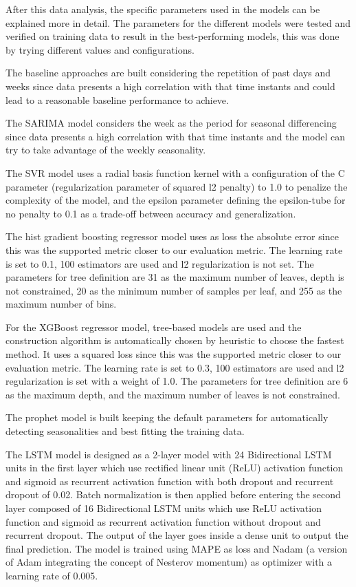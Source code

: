 After this data analysis, the specific parameters used in the models can be explained more in detail.
The parameters for the different models were tested and verified on training data to result in the best-performing models, this was done by trying different values and configurations.

The baseline approaches are built considering the repetition of past days and weeks since data presents a high correlation with that time instants and could lead to a reasonable baseline performance to achieve.

The SARIMA model considers the week as the period for seasonal differencing since data presents a high correlation with that time instants and the model can try to take advantage of the weekly seasonality.

The SVR model uses a radial basis function kernel with a configuration of the C parameter (regularization parameter of squared l2 penalty) to 1.0 to penalize the complexity of the model, and the epsilon parameter defining the epsilon-tube for no penalty to 0.1 as a trade-off between accuracy and generalization.

The hist gradient boosting regressor model uses as loss the absolute error since this was the supported metric closer to our evaluation metric.
The learning rate is set to 0.1, 100 estimators are used and l2 regularization is not set.
The parameters for tree definition are 31 as the maximum number of leaves, depth is not constrained, 20 as the minimum number of samples per leaf, and 255 as the maximum number of bins.

For the XGBoost regressor model, tree-based models are used and the construction algorithm is automatically chosen by heuristic to choose the fastest method.
It uses a squared loss since this was the supported metric closer to our evaluation metric.
The learning rate is set to 0.3, 100 estimators are used and l2 regularization is set with a weight of 1.0.
The parameters for tree definition are 6 as the maximum depth, and the maximum number of leaves is not constrained.

The prophet model is built keeping the default parameters for automatically detecting seasonalities and best fitting the training data.

The LSTM model is designed as a 2-layer model with 24 Bidirectional LSTM units in the first layer which use rectified linear unit (ReLU) activation function and sigmoid as recurrent activation function with both dropout and recurrent dropout of 0.02.
Batch normalization is then applied before entering the second layer composed of 16 Bidirectional LSTM units which use ReLU activation function and sigmoid as recurrent activation function without dropout and recurrent dropout.
The output of the layer goes inside a dense unit to output the final prediction.
The model is trained using MAPE as loss and Nadam (a version of Adam integrating the concept of Nesterov momentum) as optimizer with a learning rate of 0.005.

